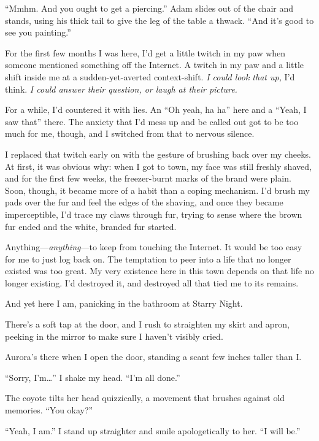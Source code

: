 ``Mmhm. And you ought to get a piercing.'' Adam slides out of the chair and stands, using his thick tail to give the leg of the table a thwack. ``And it's good to see you painting.''

\secdiv{}

\noindent For the first few months I was here, I'd get a little twitch in my paw when someone mentioned something off the Internet. A twitch in my paw and a little shift inside me at a sudden-yet-averted context-shift. \emph{I could look that up,} I'd think. \emph{I could answer their question, or laugh at their picture.}

For a while, I'd countered it with lies. An ``Oh yeah, ha ha'' here and a ``Yeah, I saw that'' there. The anxiety that I'd mess up and be called out got to be too much for me, though, and I switched from that to nervous silence.

I replaced that twitch early on with the gesture of brushing back over my cheeks. At first, it was obvious why: when I got to town, my face was still freshly shaved, and for the first few weeks, the freezer-burnt marks of the brand were plain. Soon, though, it became more of a habit than a coping mechanism. I'd brush my pads over the fur and feel the edges of the shaving, and once they became imperceptible, I'd trace my claws through fur, trying to sense where the brown fur ended and the white, branded fur started.

Anything---\emph{anything}---to keep from touching the Internet. It would be too easy for me to just log back on. The temptation to peer into a life that no longer existed was too great. My very existence here in this town depends on that life no longer existing. I'd destroyed it, and destroyed all that tied me to its remains.

And yet here I am, panicking in the bathroom at Starry Night.

There's a soft tap at the door, and I rush to straighten my skirt and apron, peeking in the mirror to make sure I haven't visibly cried.

Aurora's there when I open the door, standing a scant few inches taller than I.

``Sorry, I'm\ldots{}'' I shake my head. ``I'm all done.''

The coyote tilts her head quizzically, a movement that brushes against old memories. ``You okay?''

``Yeah, I am.'' I stand up straighter and smile apologetically to her. ``I will be.''

